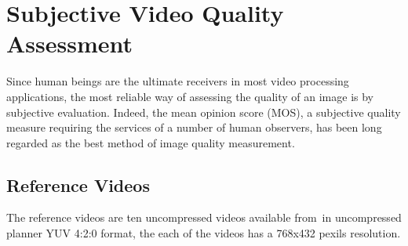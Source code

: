 \documentclass{article}
\begin{document}
\section{Subjective Video Quality Assessment}
\label{sec:subjective}
Since human beings are the ultimate receivers in most video processing applications, the most reliable way of assessing the quality of an image is by subjective evaluation. Indeed, the mean opinion score (MOS), a subjective quality measure requiring the services of a number of human observers, has been long regarded as the best method of image quality measurement.
\subsection{Reference Videos}
The reference videos are ten uncompressed videos available from~\cite{kalp2010a}in uncompressed planner YUV 4:2:0 format, the each of the videos has a 768x432 pexils resolution.
\end{document}
